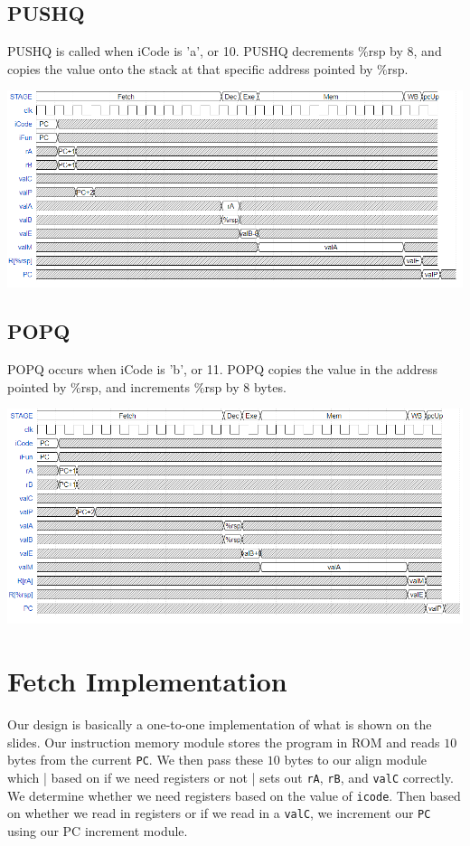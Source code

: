 \documentclass{article}
\begin{document}
\subsection{PUSHQ}
PUSHQ is called when iCode is 'a', or 10. PUSHQ decrements \%rsp by 8, and copies the value onto the stack at that specific address pointed by \%rsp. 
\begin{center}
    \includegraphics[scale=.6]{PUSHQpic.png}
\end{center}
\subsection{POPQ}
POPQ occurs when iCode is 'b', or 11. POPQ copies the value in the address pointed by \%rsp, and increments \%rsp by 8 bytes. 
\begin{center}
    \includegraphics[scale=.6]{POPQpic.png}
\end{center}
\section{Fetch Implementation}
Our design is basically a one-to-one implementation of what is shown on the slides. Our instruction memory module stores the program in ROM and reads $10$ bytes from the current \verb+PC+. We then pass these $10$ bytes to our align module which | based on if we need registers or not | sets out \verb+rA+, \verb+rB+, and \verb+valC+ correctly. We determine whether we need registers based on the value of \verb+icode+. Then based on whether we read in registers or if we read in a  \verb+valC+, we increment our \verb+PC+ using our PC increment module.
\end{document}
